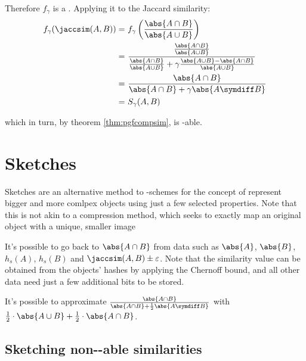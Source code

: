 Therefore $f_\gamma$ is a \pgf. Applying it to the Jaccard similarity:
\begin{align*}
        f_\gamma (\jaccsim(A, B))
    =&\ f_\gamma \left( \frac{\abs{A \cap B}}{\abs{A \cup B}} \right) \\
    =&\ \frac{\frac{\abs{A \cap B}}{\abs{A \cup B}}} {\frac{\abs{A \cap B}}{\abs{A \cup B}} + \gamma \frac{\abs{A \cup B} - \abs{A \cap B}}{\abs{A \cup B}}} \\
    =&\ \frac{\abs{A \cap B}} {\abs{A \cap B} + \gamma \abs{A \symdiff B}} \\
    =&\ S_\gamma(A, B)
\end{align*}

which in turn, by theorem \ref{thm:pgfcompsim}, is \lsh-able.


\section{Sketches}

Sketches are an alternative method to \lsh-schemes for the concept of  represent bigger and more comlpex objects using just a few selected properties. Note that this is not akin to a compression method, which seeks to exactly map an original object with a unique, smaller image

\begin{example}
    It's possible to go back to $\abs{A \cap B}$ from data such as $\abs{A}$, $\abs{B}$, $h_s(A)$, $h_s(B)$ and $\jaccsim(A, B) \pm \varepsilon$. Note that the similarity value can be obtained from the objects' hashes by applying the Chernoff bound, and all other data need just a few additional bits to be stored.
\end{example}

\begin{example}
    It's possible to approximate $\frac{\abs{A \cap B}}{\abs{A \cap B} + \frac{1}{2}\abs{A \symdiff B}}$ with $\frac{1}{2} \cdot \abs{A \cup B} + \frac{1}{2} \cdot \abs{A \cap B}$.
\end{example}

    
    
    
    
\subsection{Sketching non-\lsh-able similarities}

